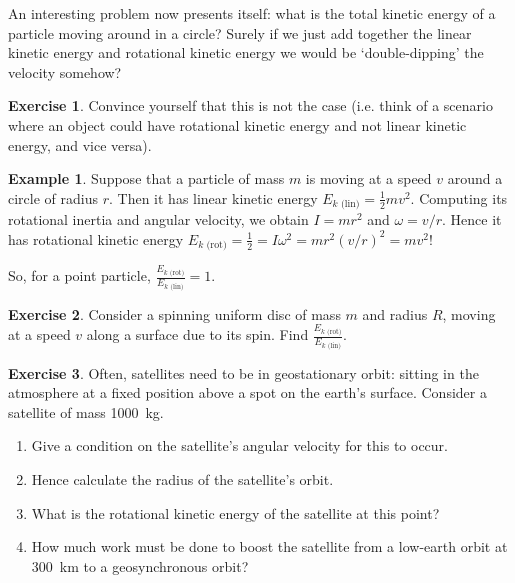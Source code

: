 \documentclass[a4paper]{amsbook}
\newcommand{\marginsymbol}{}
\newcommand{\ekl}{E_{k \text{ (lin)}}}
\newcommand{\ekr}{E_{k \text{ (rot)}}}
\theoremstyle{definition}
\newtheorem*{example}{Example}
\newtheorem{exercise}{Exercise}
\numberwithin{exercise}{chapter}
\numberwithin{exercise}{chapter}
\begin{document}
\marginsymbol An interesting problem now presents itself: what is the total kinetic energy of a particle moving around in a circle? Surely if
we just add together the linear kinetic energy and rotational kinetic energy we would be `double-dipping' the velocity somehow?

\begin{exercise}
  Convince yourself that this is not the case (i.e. think of a scenario where an object could have rotational kinetic energy and not
  linear kinetic energy, and vice versa).
\end{exercise}

\begin{example}
  Suppose that a particle of mass $ m $ is moving at a speed $ v $ around a circle of radius $ r $. Then it has linear kinetic
  energy $ \ekl = \frac{1}{2} mv^2 $. Computing its rotational inertia and angular velocity, we obtain $ I = mr^2 $ and $ \omega = v/r $.
  Hence it has rotational kinetic energy $ \ekr = \frac{1}{2} = I \omega^2 = mr^2 (v/r)^2 = mv^2 $!
\end{example}

So, for a point particle, $ \frac{\ekr}{\ekl} = 1 $.

\begin{exercise}
  Consider a spinning uniform disc of mass $ m $ and radius $ R $, moving at a speed $ v $ along a surface due to its spin. Find $ \frac{\ekr}{\ekl} $.
\end{exercise}

\begin{exercise}
  Often, satellites need to be in geostationary orbit: sitting in the atmosphere at a fixed position above a spot on the earth's
  surface. Consider a satellite of mass \SI{1000}{\kilo\gram}.
  \begin{enumerate}
    \item Give a condition on the satellite's angular velocity for this to occur.
    \item Hence calculate the radius of the satellite's orbit.
    \item What is the rotational kinetic energy of the satellite at this point?
    \item How much work must be done to boost the satellite from a low-earth orbit at \SI{300}{\kilo\metre} to a geosynchronous orbit?
  \end{enumerate}
\end{exercise}
\end{document}
